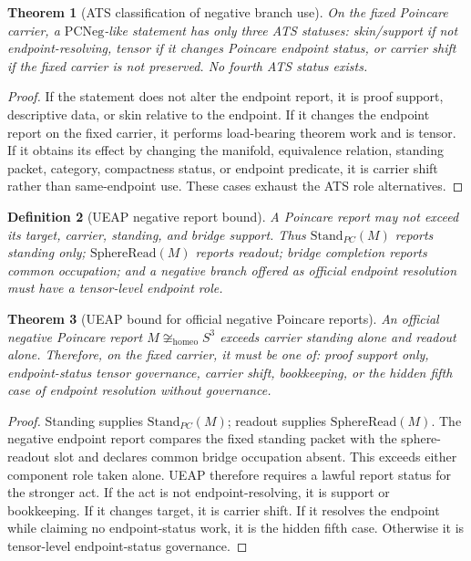 \documentclass[11pt]{article}
\newtheorem{theorem}{Theorem}[section]
\newtheorem{definition}[theorem]{Definition}
\newcommand{\Sthree}{S^{3}}
\newcommand{\StandPC}{\mathrm{Stand}_{PC}}
\newcommand{\SphereRead}{\mathrm{SphereRead}}
\newcommand{\PCNeg}{\mathrm{PCNeg}}
\newcommand{\Homeo}{\cong_{\mathrm{homeo}}}
\begin{document}
\begin{theorem}[ATS classification of negative branch use]\label{thm:ats-negative-classification}
On the fixed Poincare carrier, a \(\PCNeg\)-like statement has only three ATS statuses: skin/support if not endpoint-resolving, tensor if it changes Poincare endpoint status, or carrier shift if the fixed carrier is not preserved. No fourth ATS status exists.
\end{theorem}
\begin{proof}
If the statement does not alter the endpoint report, it is proof support, descriptive data, or skin relative to the endpoint. If it changes the endpoint report on the fixed carrier, it performs load-bearing theorem work and is tensor. If it obtains its effect by changing the manifold, equivalence relation, standing packet, category, compactness status, or endpoint predicate, it is carrier shift rather than same-endpoint use. These cases exhaust the ATS role alternatives.
\end{proof}

\begin{definition}[UEAP negative report bound]
A Poincare report may not exceed its target, carrier, standing, and bridge support. Thus \(\StandPC(M)\) reports standing only; \(\SphereRead(M)\) reports readout; bridge completion reports common occupation; and a negative branch offered as official endpoint resolution must have a tensor-level endpoint role.
\end{definition}

\begin{theorem}[UEAP bound for official negative Poincare reports]\label{thm:ueap-negative-bound}
An official negative Poincare report \(M\not\Homeo\Sthree\) exceeds carrier standing alone and readout alone. Therefore, on the fixed carrier, it must be one of: proof support only, endpoint-status tensor governance, carrier shift, bookkeeping, or the hidden fifth case of endpoint resolution without governance.
\end{theorem}
\begin{proof}
Standing supplies \(\StandPC(M)\); readout supplies \(\SphereRead(M)\). The negative endpoint report compares the fixed standing packet with the sphere-readout slot and declares common bridge occupation absent. This exceeds either component role taken alone. UEAP therefore requires a lawful report status for the stronger act. If the act is not endpoint-resolving, it is support or bookkeeping. If it changes target, it is carrier shift. If it resolves the endpoint while claiming no endpoint-status work, it is the hidden fifth case. Otherwise it is tensor-level endpoint-status governance.
\end{proof}
\end{document}
